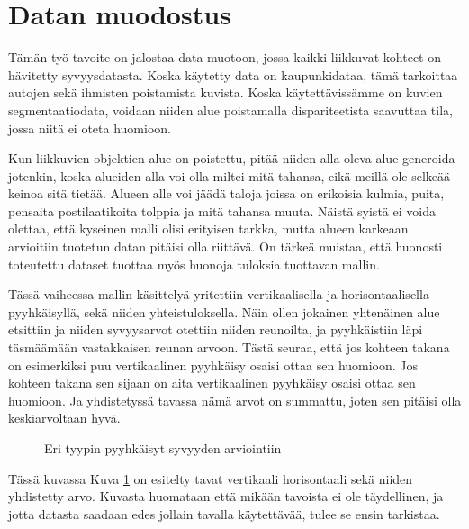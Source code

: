 \section{Datan muodostus}

Tämän työ tavoite on jalostaa data muotoon, jossa kaikki liikkuvat kohteet on hävitetty syvyysdatasta.
Koska käytetty data on kaupunkidataa, tämä tarkoittaa autojen sekä ihmisten poistamista kuvista.
Koska käytettävissämme on kuvien segmentaatiodata, voidaan niiden alue poistamalla dispariteetista saavuttaa tila, jossa niitä ei oteta huomioon.

Kun liikkuvien objektien alue on poistettu, pitää niiden alla oleva alue generoida jotenkin,
koska alueiden alla voi olla miltei mitä tahansa, 
eikä meillä ole selkeää keinoa sitä tietää. 
Alueen alle voi jäädä taloja joissa on erikoisia kulmia, puita, pensaita postilaatikoita tolppia ja mitä tahansa muuta. 
Näistä syistä ei voida olettaa, että kyseinen malli olisi erityisen tarkka, 
mutta alueen karkeaan arvioitiin tuotetun datan pitäisi olla riittävä.
On tärkeä muistaa, että huonosti toteutettu dataset tuottaa myös huonoja tuloksia tuottavan mallin.

Tässä vaiheessa mallin käsittelyä yritettiin vertikaalisella ja horisontaalisella pyyhkäisyllä, sekä niiden yhteistuloksella.
Näin ollen jokainen yhtenäinen alue etsittiin ja niiden syvyysarvot otettiin niiden reunoilta,
ja pyyhkäistiin läpi täsmäämään vastakkaisen reunan arvoon.
Tästä seuraa, että jos kohteen takana on esimerkiksi puu vertikaalinen pyyhkäisy osaisi ottaa sen huomioon.
Jos kohteen takana sen sijaan on aita vertikaalinen pyyhkäisy osaisi ottaa sen huomioon.
Ja yhdistetyssä tavassa nämä arvot on summattu, joten sen pitäisi olla keskiarvoltaan hyvä. 

\begin{figure}[h]
    \centering
    \caption{Eri tyypin pyyhkäisyt syvyyden arviointiin}
    \label{fig:swipe}
    \end{figure}


Tässä kuvassa Kuva \ref{fig:swipe} on esitelty tavat vertikaali horisontaali sekä niiden yhdistetty arvo. 
Kuvasta huomataan että mikään tavoista ei ole täydellinen,
ja jotta datasta saadaan edes jollain tavalla käytettävää, tulee se ensin tarkistaa. 

